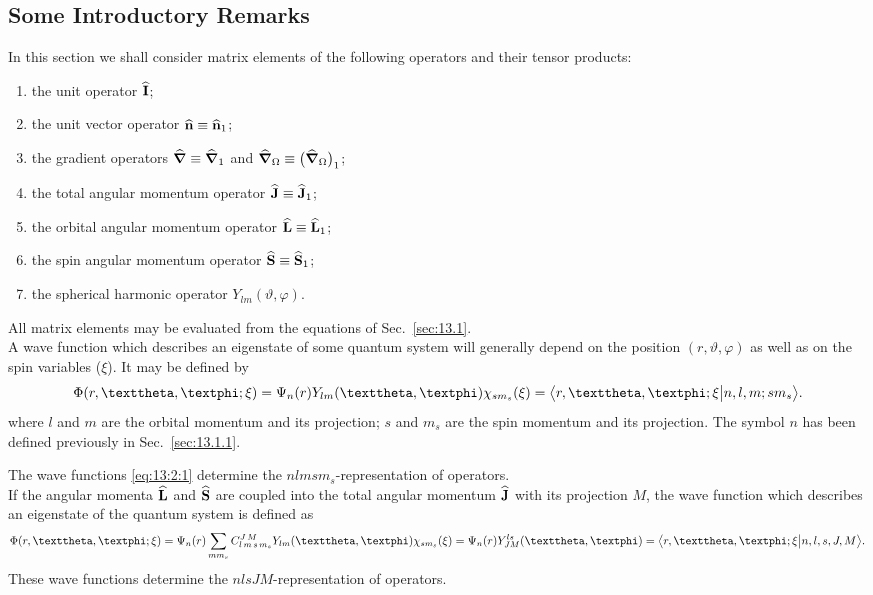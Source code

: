 \subsection{Some Introductory Remarks}\label{sec:13.2.1}
In this section we shall consider matrix elements of the following operators and their tensor products:
\begin{enumerate}[label=(\alph*)]
\item the unit operator \(\widehat{\mathbf{I}}\);
\item the unit vector operator \(\widehat{\mathbf{n}} \equiv \widehat{\mathbf{n}}_{1}\);
\item the gradient operators \(\widehat{\boldsymbol{\nabla}} \equiv \widehat{\boldsymbol{\nabla}}_{1}\) and \(\widehat{\boldsymbol{\nabla}}_{\Omega} \equiv\bigl(\widehat{\boldsymbol{\nabla}}_{\Omega}\bigr)_{1}\);
\item the total angular momentum operator \(\widehat{\mathbf{J}} \equiv \widehat{\mathbf{J}}_{1}\);
\item the orbital angular momentum operator \(\widehat{\mathbf{L}} \equiv \widehat{\mathbf{L}}_{1}\);
\item the spin angular momentum operator \(\widehat{\mathbf{S}} \equiv \widehat{\mathbf{S}}_{1}\);
\item the spherical harmonic operator \(Y_{l m}(\vartheta, \varphi)\).
\end{enumerate}
All matrix elements may be evaluated from the equations of Sec.~\ref{sec:13.1}.\\
A wave function which describes an eigenstate of some quantum system will generally depend on the position \((r, \vartheta, \varphi)\) as well as on the spin variables (\(\xi\)). It may be defined by
\begin{equation}
\Phi(r, \vartheta, \varphi ; \xi)=\Psi_{n}(r) Y_{l m}(\vartheta, \varphi) \chi_{s m_{s}}(\xi)=
\braket{r, \vartheta, \varphi ; \xi}{n, l, m ; s m_{s}}. \label{eq:13:2:1}
\end{equation}
where \(l\) and \(m\) are the orbital momentum and its projection; \(s\) and \(m_{s}\) are the spin momentum and its projection. The symbol \(n\) has been defined previously in Sec.~\ref{sec:13.1.1}.

The wave functions \eqref{eq:13:2:1} determine the $nlmsm_s$-representation of operators.\\
If the angular momenta \(\widehat{\mathbf{L}}\) and \(\widehat{\mathbf{S}}\) are coupled into the total angular momentum \(\widehat{\mathbf{J}}\) with its projection \(M\), the wave function which describes an eigenstate of the quantum system is defined as
\begin{equation}
\Phi(r, \vartheta, \varphi ; \xi)=\Psi_{n}(r) \sum_{m m_{s}}
\clebsch{l}{m}{s}{m_{s}}{J}{M} Y_{l m}(\vartheta, \varphi) \chi_{s m_{s}}(\xi)=\Psi_{n}(r) Y_{J M}^{l s}(\vartheta, \varphi)=
\braket{r, \vartheta, \varphi ; \xi}{ n, l, s, J, M}. \label{eq:13:2:2}
\end{equation}
These wave functions determine the \(n l s J M\)-representation of operators.

